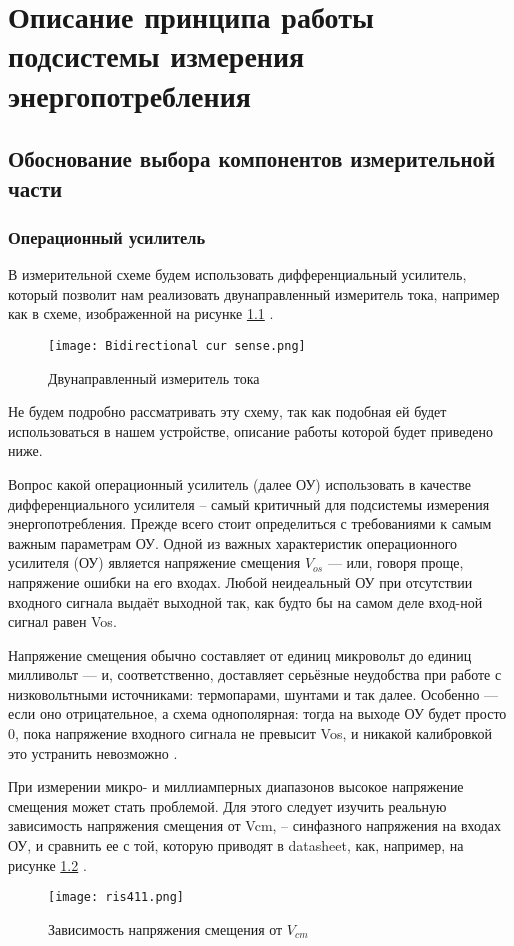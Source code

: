 \chapter{Описание принципа работы подсистемы измерения энергопотребления}
\section{Обоснование выбора компонентов измерительной части}
\subsection{Операционный усилитель}
\hspace{1cm} 

В измерительной схеме будем использовать дифференциальный усилитель, который позволит нам реализовать
двунаправленный измеритель тока, например как в схеме, изображенной на рисунке 
\ref{ris:Bidirectional cur sense} \cite{Bidirectional cur sense}. 

\begin{figure}[H]
\centering
\texttt{[image: Bidirectional cur sense.png]}
\caption{Двунаправленный измеритель тока}
\label{ris:Bidirectional cur sense}
\end{figure}

Не будем подробно рассматривать эту схему, так как подобная ей будет использоваться в нашем устройстве,
описание работы которой будет приведено ниже.

Вопрос какой операционный усилитель (далее ОУ) использовать в качестве дифференциального усилителя -- самый 
критичный для подсистемы измерения энергопотребления. Прежде всего стоит определиться с требованиями к 
самым важным параметрам ОУ. 
Одной из важных характеристик операционного усилителя (ОУ) является напряжение смещения $V_{os}$ — или, 
говоря проще, напряжение ошибки на его входах. Любой неидеальный ОУ при отсутствии входного сигнала выдаёт 
выходной так, как будто бы на самом деле вход-ной сигнал равен Vos.

Напряжение смещения обычно составляет от единиц микровольт до единиц милливольт — и, соответственно, 
доставляет серьёзные неудобства при работе с низковольтными источниками: термопарами, шунтами и так далее.
Особенно — если оно отрицательное, а схема однополярная: тогда на выходе ОУ будет просто 0, пока 
напряжение входного сигнала не превысит Vos, и никакой калибровкой это устранить невозможно \cite{Chopper:OU} 
\cite{MT-037:Tutorial}. 

При измерении микро- и миллиамперных диапазонов высокое напряжение смещения может стать проблемой.
Для этого следует изучить реальную зависимость напряжения смещения от Vcm, -- синфазного
напряжения на входах ОУ, и сравнить ее с той, 
которую приводят в datasheet, как, например, на рисунке \ref{ris:411} \cite{OPAx376:datasheet}.
\begin{figure}[H]
\centering
\texttt{[image: ris411.png]}
\caption{Зависимость напряжения смещения от $V_{cm}$}
\label{ris:411}
\end{figure}

